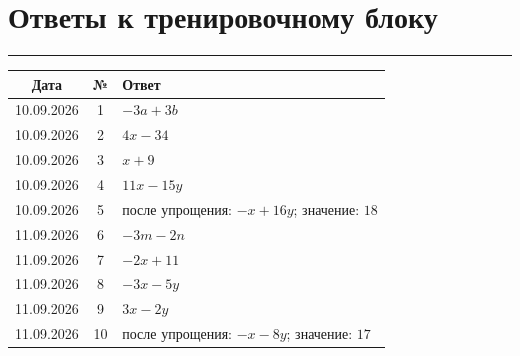 \documentclass[a4paper,12pt]{article}
\newcommand{\topicline}{\par\noindent\color{accent}\rule{\linewidth}{0.6pt}\color{black}\par}
\begin{document}
\section*{Ответы к тренировочному блоку}
\topicline
\begin{center}
\begin{tabularx}{\linewidth}{@{}c c X@{}}
\toprule
\textbf{Дата} & \textbf{№} & \textbf{Ответ}\\
\midrule
10.09.2026 & 1 & $-3a+3b$\\
10.09.2026 & 2 & $4x-34$\\
10.09.2026 & 3 & $x+9$\\
10.09.2026 & 4 & $11x-15y$\\
10.09.2026 & 5 & после упрощения: $-x+16y$; значение: $18$\\
\midrule
11.09.2026 & 6 & $-3m-2n$\\
11.09.2026 & 7 & $-2x+11$\\
11.09.2026 & 8 & $-3x-5y$\\
11.09.2026 & 9 & $3x-2y$\\
11.09.2026 & 10 & после упрощения: $-x-8y$; значение: $17$\\
\bottomrule
\end{tabularx}
\end{center}
\end{document}
